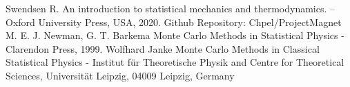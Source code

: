 \begin{thebibliography}{9}
 Swendsen R. An introduction to statistical mechanics and thermodynamics. – Oxford University Press, USA, 2020.
 Github Repository: Chpel/ProjectMagnet
 M. E. J. Newman, G. T. Barkema Monte Carlo Methods in Statistical Physics - Clarendon Press, 1999.
 Wolfhard Janke Monte Carlo Methods in Classical Statistical Physics - Institut für Theoretische Physik and Centre for Theoretical Sciences, Universität Leipzig, 04009 Leipzig, Germany
\end{thebibliography}